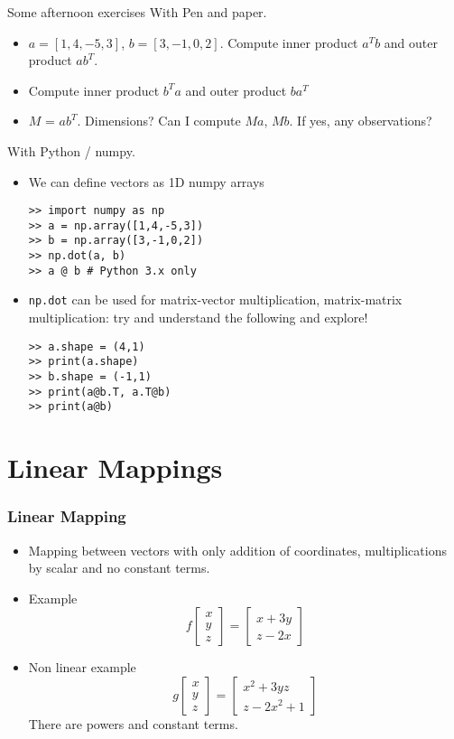 \documentclass[8pt,dvipsnames]{beamer}
\begin{document}
\begin{frame}[fragile]{Some afternoon exercises}
  With Pen and paper.
  \begin{itemize}
  \item $a = [1,4,-5,3]$, $b = [3,-1,0,2]$. Compute inner product $a^T b$ and outer product $a b^T$.
  \item Compute inner product $b^T a$ and outer product $ba^T$
  \item $M$ = $ab^T$. Dimensions? Can I compute $M a$, $M b$. If yes, any observations?
  \end{itemize}
  With Python / numpy.
  \begin{itemize}
  \item We can define vectors as 1D numpy arrays 
\begin{verbatim}
>> import numpy as np
>> a = np.array([1,4,-5,3])
>> b = np.array([3,-1,0,2])
>> np.dot(a, b)
>> a @ b # Python 3.x only
\end{verbatim}
  \item \texttt{np.dot} can be used for matrix-vector multiplication, matrix-matrix multiplication: try and understand the following and explore!
\begin{verbatim}
>> a.shape = (4,1)
>> print(a.shape)
>> b.shape = (-1,1)
>> print(a@b.T, a.T@b)
>> print(a@b)
\end{verbatim}
  \end{itemize}
\end{frame}



\section{Linear Mappings}


\begin{frame}
  \frametitle{Linear Mapping}
  \begin{itemize}
  \item Mapping between vectors with only addition of coordinates, multiplications by scalar and no constant terms.
  \item Example
    $$
    f
    \begin{bmatrix}
      x\\y\\z
    \end{bmatrix}
    =
    \begin{bmatrix}
      x+3y\\z-2x
    \end{bmatrix}
    $$
  \item Non linear example
    $$g
    \begin{bmatrix}
      x\\y\\z
    \end{bmatrix}
    =
    \begin{bmatrix}
      x^2+3yz\\z-2x^2 + 1
    \end{bmatrix}
    $$
    There are powers and constant terms.
  \end{itemize}
\end{frame}
\end{document}
